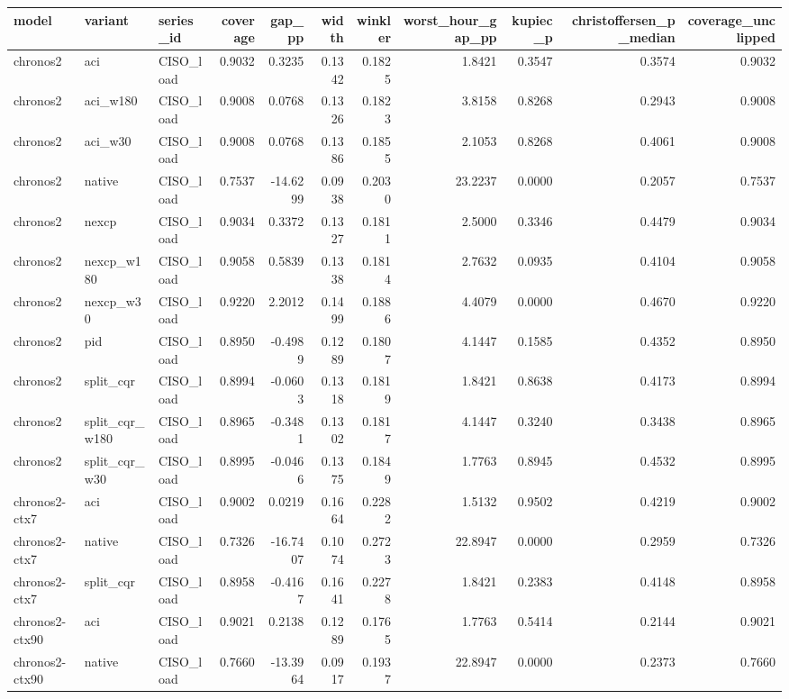 \begin{tabular}{lllrrrrrrrr}
\toprule
model & variant & series_id & coverage & gap_pp & width & winkler & worst_hour_gap_pp & kupiec_p & christoffersen_p_median & coverage_unclipped \\
\midrule
chronos2 & aci & CISO_load & 0.9032 & 0.3235 & 0.1342 & 0.1825 & 1.8421 & 0.3547 & 0.3574 & 0.9032 \\
chronos2 & aci_w180 & CISO_load & 0.9008 & 0.0768 & 0.1326 & 0.1823 & 3.8158 & 0.8268 & 0.2943 & 0.9008 \\
chronos2 & aci_w30 & CISO_load & 0.9008 & 0.0768 & 0.1386 & 0.1855 & 2.1053 & 0.8268 & 0.4061 & 0.9008 \\
chronos2 & native & CISO_load & 0.7537 & -14.6299 & 0.0938 & 0.2030 & 23.2237 & 0.0000 & 0.2057 & 0.7537 \\
chronos2 & nexcp & CISO_load & 0.9034 & 0.3372 & 0.1327 & 0.1811 & 2.5000 & 0.3346 & 0.4479 & 0.9034 \\
chronos2 & nexcp_w180 & CISO_load & 0.9058 & 0.5839 & 0.1338 & 0.1814 & 2.7632 & 0.0935 & 0.4104 & 0.9058 \\
chronos2 & nexcp_w30 & CISO_load & 0.9220 & 2.2012 & 0.1499 & 0.1886 & 4.4079 & 0.0000 & 0.4670 & 0.9220 \\
chronos2 & pid & CISO_load & 0.8950 & -0.4989 & 0.1289 & 0.1807 & 4.1447 & 0.1585 & 0.4352 & 0.8950 \\
chronos2 & split_cqr & CISO_load & 0.8994 & -0.0603 & 0.1318 & 0.1819 & 1.8421 & 0.8638 & 0.4173 & 0.8994 \\
chronos2 & split_cqr_w180 & CISO_load & 0.8965 & -0.3481 & 0.1302 & 0.1817 & 4.1447 & 0.3240 & 0.3438 & 0.8965 \\
chronos2 & split_cqr_w30 & CISO_load & 0.8995 & -0.0466 & 0.1375 & 0.1849 & 1.7763 & 0.8945 & 0.4532 & 0.8995 \\
chronos2-ctx7 & aci & CISO_load & 0.9002 & 0.0219 & 0.1664 & 0.2282 & 1.5132 & 0.9502 & 0.4219 & 0.9002 \\
chronos2-ctx7 & native & CISO_load & 0.7326 & -16.7407 & 0.1074 & 0.2723 & 22.8947 & 0.0000 & 0.2959 & 0.7326 \\
chronos2-ctx7 & split_cqr & CISO_load & 0.8958 & -0.4167 & 0.1641 & 0.2278 & 1.8421 & 0.2383 & 0.4148 & 0.8958 \\
chronos2-ctx90 & aci & CISO_load & 0.9021 & 0.2138 & 0.1289 & 0.1765 & 1.7763 & 0.5414 & 0.2144 & 0.9021 \\
chronos2-ctx90 & native & CISO_load & 0.7660 & -13.3964 & 0.0917 & 0.1937 & 22.8947 & 0.0000 & 0.2373 & 0.7660 \\

\end{tabular}
